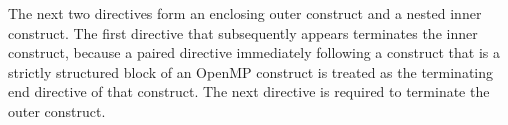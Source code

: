 The next two  directives form an enclosing outer  construct 
and a nested inner  construct. The first  directive
that subsequently appears terminates the inner  construct, 
because a paired  directive immediately following a  construct that is 
a strictly structured block of an OpenMP construct is treated as the terminating end directive 
of that construct. 
The next  directive is required to terminate the outer  construct.

